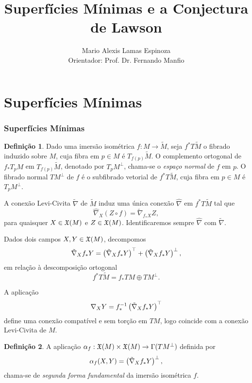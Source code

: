 \documentclass[12pt,a4paper]{beamer}
\author{Mario Alexis Lamas Espinoza \\ Orientador: Prof. Dr. Fernando Manfio}
\title{Superfícies Mínimas e a Conjectura de Lawson}
\theoremstyle{definition}
\newtheorem{definicao}{Definição}
\begin{document}
\begin{frame}
	\maketitle	
\end{frame}

\section{Superfícies Mínimas}

\begin{frame}
	\frametitle{Superfícies Mínimas}
	\begin{definicao}
		Dado uma imersão isométrica $f: M \rightarrow \tilde{M}$, seja $f^* T\tilde{M}$ o fibrado induzido sobre $M$, cuja fibra em $p \in M$ é $T_{f(p)} \tilde{M}$. O complemento ortogonal de $f_* T_p M$ em $T_{f(p)} \tilde{M}$, denotado por $T_p M^\perp$, chama-se o \emph{espaço normal} de $f$ em $p$. O fibrado normal $TM^\perp$ de $f$ é o subfibrado vetorial de $f^* T \tilde{M}$, cuja fibra em $p \in M$ é $T_p M^\perp$.  
	\end{definicao}
\end{frame}

\begin{frame}
	A conexão Levi-Civita $\tilde{\nabla}$ de $\tilde{M}$ induz uma única conexão $\hat{\nabla}$ em $f^* T \tilde{M}$ tal que
	\begin{equation*}
		\hat{\nabla}_X (Z \circ f) = \tilde{\nabla}_{f_* X} Z, 
	\end{equation*}
	para quaisquer $X \in \mathfrak{X}(M)$ e $Z \in \mathfrak{X}(M)$. Identificaremos sempre $\hat{\nabla}$ com $\tilde{\nabla}$.
	
	Dados dois campos $X,Y \in \mathfrak{X}(M)$, decompomos
	\begin{equation*}
		\tilde{\nabla}_X f_* Y = \left( \tilde{\nabla}_X f_* Y \right)^\top + \left( \tilde{\nabla}_X f_* Y \right)^\perp,
	\end{equation*}  
	em relação à descomposição ortogonal
	\begin{equation*}
		f^* T \tilde{M} = f_* TM \oplus TM^\perp.
	\end{equation*}
\end{frame}


\begin{frame}
	A aplicação
	\begin{equation*}
	\nabla_X Y = f_*^{-1} \left( \tilde{\nabla}_X f_* Y \right)^\top
	\end{equation*}
	define uma conexão compatível e sem torção em $TM$, logo coincide com a conexão Levi-Civita de $M$.
	
	\begin{definicao}
		A aplicação $\alpha_f: \mathfrak{X}(M) \times \mathfrak{X}(M) \rightarrow \Gamma(TM^\perp)$ definida por
		\begin{equation*}
			\alpha_f(X,Y) = \left( \tilde{\nabla}_X f_* Y \right)^\perp,
		\end{equation*}
		chama-se de \emph{segunda forma fundamental} da imersão isométrica $f$.
	\end{definicao}
\end{frame}
\end{document}
